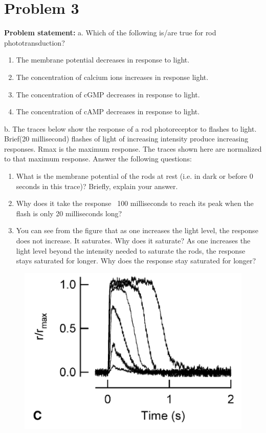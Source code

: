 \documentclass[letterpaper, 11pt]{article}
\begin{document}
\section{Problem 3}
\label{sec:prob3}
\textbf{Problem statement:} 
a. Which of the following is/are true for rod phototransduction?
\begin{enumerate}
	\item The membrane potential decreases in response to light.
	\item The concentration of calcium ions increases in response light.
	\item The concentration of cGMP decreases in response to light.
	\item The concentration of cAMP decreases in response to light.
\end{enumerate}
b. The traces below show the response of a rod photoreceptor to flashes to light. Brief(20 millisecond) flashes of light of increasing intensity produce increasing responses. Rmax is the maximum response. The traces shown here are normalized to that maximum response. Answer the following questions:
\begin{enumerate}
	\item What is the membrane potential of the rods at rest (i.e. in dark or before 0 seconds in this trace)? Briefly, explain your answer.
	\item Why does it take the response ~100 milliseconds to reach its peak when the flash is only 20 milliseconds long?
	\item You can see from the figure that as one increases the light level, the response does not increase. It saturates. Why does it saturate? As one increases the light level beyond the intensity needed to saturate the rods, the response stays saturated for longer. Why does the response stay saturated for longer?
\end{enumerate}

\begin{figure}[htb!]
	\centering
	\includegraphics[width=0.6\linewidth]{2_fig.png}
	\label{fig3}
\end{figure}
\end{document}
